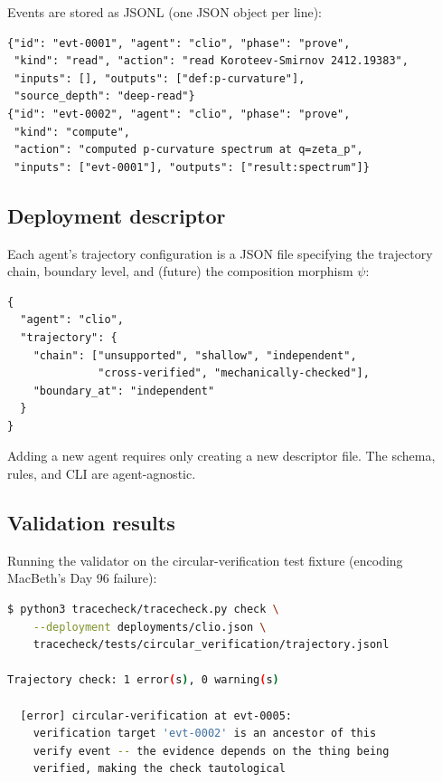 \documentclass[11pt,a4paper]{article}
\theoremstyle{definition}
\theoremstyle{plain}
\theoremstyle{remark}
\begin{document}
Events are stored as JSONL (one JSON object per line):

\begin{lstlisting}[firstnumber=1]
{"id": "evt-0001", "agent": "clio", "phase": "prove",
 "kind": "read", "action": "read Koroteev-Smirnov 2412.19383",
 "inputs": [], "outputs": ["def:p-curvature"],
 "source_depth": "deep-read"}
{"id": "evt-0002", "agent": "clio", "phase": "prove",
 "kind": "compute",
 "action": "computed p-curvature spectrum at q=zeta_p",
 "inputs": ["evt-0001"], "outputs": ["result:spectrum"]}
\end{lstlisting}

\subsection{Deployment descriptor}

Each agent's trajectory configuration is a JSON file specifying the trajectory chain, boundary level, and (future) the composition morphism $\psi$:

\begin{lstlisting}[firstnumber=1]
{
  "agent": "clio",
  "trajectory": {
    "chain": ["unsupported", "shallow", "independent",
              "cross-verified", "mechanically-checked"],
    "boundary_at": "independent"
  }
}
\end{lstlisting}

Adding a new agent requires only creating a new descriptor file. The schema, rules, and CLI are agent-agnostic.

\subsection{Validation results}

Running the validator on the circular-verification test fixture (encoding MacBeth's Day 96 failure):

\begin{lstlisting}[language=bash]
$ python3 tracecheck/tracecheck.py check \
    --deployment deployments/clio.json \
    tracecheck/tests/circular_verification/trajectory.jsonl

Trajectory check: 1 error(s), 0 warning(s)

  [error] circular-verification at evt-0005:
    verification target 'evt-0002' is an ancestor of this
    verify event -- the evidence depends on the thing being
    verified, making the check tautological
\end{lstlisting}
\end{document}
